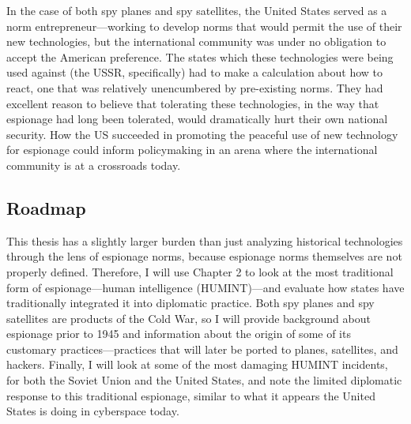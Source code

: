 \documentclass{memoir}
\begin{document}
\begin{refsegment}
In the case of both spy planes and spy satellites, the United States served as a norm entrepreneur---working to develop norms that would permit the use of their new technologies, but the international community was under no obligation to accept the American preference. The states which these technologies were being used against (the USSR, specifically) had to make a calculation about how to react, one that was relatively unencumbered by pre-existing norms. They had excellent reason to believe that tolerating these technologies, in the way that espionage had long been tolerated, would dramatically hurt their own national security. How the US succeeded in promoting the peaceful use of new technology for espionage could inform policymaking in an arena where the international community is at a crossroads today.


\subsection{Roadmap}
This thesis has a slightly larger burden than just analyzing historical technologies through the lens of espionage norms, because espionage norms themselves are not properly defined. Therefore, I will use Chapter 2 to look at the most traditional form of espionage---human intelligence (HUMINT)---and evaluate how states have traditionally integrated it into diplomatic practice. Both spy planes and spy satellites are products of the Cold War, so I will provide background about espionage prior to 1945 and information about the origin of some of its customary practices---practices that will later be ported to planes, satellites, and hackers. Finally, I will look at some of the most damaging HUMINT incidents, for both the Soviet Union and the United States, and note the limited diplomatic response to this traditional espionage, similar to what it appears the United States is doing in cyberspace today.


\end{refsegment}
\end{document}
